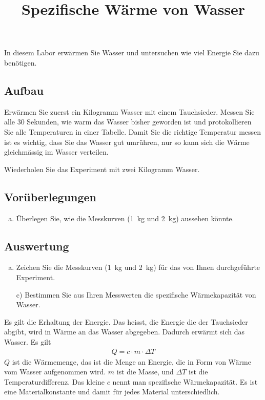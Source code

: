\documentclass[11pt,a4paper, twosite]{article}
\author{}
\date{}
\title{Spezifische Wärme von Wasser}
\begin{document}
\maketitle

In diesem Labor erwärmen Sie Wasser und untersuchen wie viel Energie Sie dazu benötigen.

\subsection*{Aufbau}
Erwärmen Sie zuerst ein Kilogramm Wasser mit einem Tauchsieder.
Messen Sie alle 30 Sekunden, wie warm das Wasser bisher geworden ist und protokollieren Sie alle Temperaturen in einer Tabelle.
Damit Sie die richtige Temperatur messen ist es wichtig, dass Sie das Wasser gut umrühren, nur so kann sich die Wärme gleichmässig im Wasser verteilen.

Wiederholen Sie das Experiment mit zwei Kilogramm Wasser.

\subsection*{Vorüberlegungen}
\begin{enumerate}[a)]
	\item Überlegen Sie, wie die Messkurven (\SI{1}{kg} und \SI{2}{kg}) aussehen könnte.
\end{enumerate}

\subsection*{Auswertung}
\begin{enumerate}[b)]
	\item Zeichen Sie die Messkurven (\SI{1}{kg} und \SI{2}{kg}) für das von Ihnen durchgeführte Experiment.

	\item [c)] Bestimmen Sie aus Ihren Messwerten die spezifische Wärmekapazität von Wasser.
\end{enumerate}



Es gilt die Erhaltung der Energie. Das heisst, die Energie die der Tauchsieder abgibt, wird in Wärme an das Wasser abgegeben.
Dadurch erwärmt sich das Wasser. Es gilt
\begin{eqnarray*}
	Q = c\cdot m\cdot \Delta T
\end{eqnarray*}
$Q$ ist die Wärmemenge, das ist die Menge an Energie, die in Form von Wärme vom Wasser aufgenommen wird.
$m$ ist die Masse, und $\Delta T$ ist die Temperaturdifferenz.
Das kleine $c$ nennt man spezifische Wärmekapazität. Es ist eine Materialkonstante und damit für jedes Material unterschiedlich.
\end{document}

